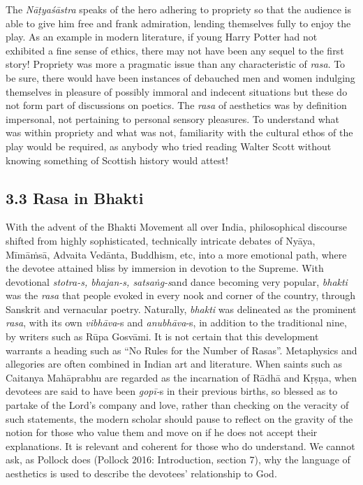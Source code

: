 The \textit{Nāṭyaśāstra} speaks of the hero adhering to propriety so that the audience is able to give him free and frank admiration, lending themselves fully to enjoy the play. As an example in modern literature, if young Harry Potter had not exhibited a fine sense of ethics, there may not have been any sequel to the first story! Propriety was more a pragmatic issue than any characteristic of \textit{rasa}. To be sure, there would have been instances of debauched men and women indulging themselves in pleasure of possibly immoral and indecent situations but these do not form part of discussions on poetics. The \textit{rasa} of aesthetics was by definition impersonal, not pertaining to personal sensory pleasures. To understand what was within propriety and what was not, familiarity with the cultural ethos of the play would be required, as anybody who tried reading Walter Scott without knowing something of Scottish history would attest!

\vspace{-.3cm}

\subsection*{3.3 Rasa in Bhakti}

With the advent of the Bhakti Movement all over India, philosophical discourse shifted from highly sophisticated, technically intricate debates of Nyāya, Mīmāṁsā, Advaita Vedānta, Buddhism, etc, into a more emotional path, where the devotee attained bliss by immersion in devotion to the Supreme. With devotional \textit{stotra-s, bhajan-s, satsaṅg-s}\break and dance becoming very popular, \textit{bhakti} was the \textit{rasa} that people evoked in every nook and corner of the country, through Sanskrit and vernacular poetry. Naturally, \textit{bhakti} was delineated as the prominent \textit{rasa}, with its own \textit{vibhāva}-s and \textit{anubhāva}-s, in addition to the traditional nine, by writers such as Rūpa Gosvāmi. It is not certain that this development warrants a heading such as “No Rules for the Number of Rasas”. Metaphysics and allegories are often combined in Indian art and literature. When saints such as Caitanya Mahāprabhu are regarded as the incarnation of Rādhā and Kṛṣṇa, when devotees are said to have been \textit{gopī-}s in their previous births, so blessed as to partake of the Lord’s company and love, rather than checking on the veracity of such statements, the modern scholar should pause to reflect on the gravity of the notion for those who value them and move on if he does not accept their explanations. It is relevant and coherent for those who do understand. We cannot ask, as Pollock does (Pollock 2016: Introduction, section 7), why the language of aesthetics is used to describe the devotees’ relationship to God.


